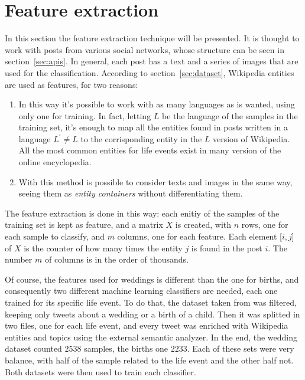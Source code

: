\section{Feature extraction}
\label{sec:featurextraction}
In this section the feature extraction technique will be presented. It is thought to work with posts from various social networks, whose structure can be seen in section~\ref{sec:apis}. In general, each post has a text and a series of images that are used for the classification. According to section~\ref{sec:dataset}, Wikipedia entities are used as features, for two reasons:
\begin{enumerate}
\item In this way it's possible to work with as many languages as is wanted, using only one for training. In fact, letting $ L $ be the language of the samples in the training set, it's enough to map all the entities found in posts written in a language $ L^{'} \ne L $ to the corrisponding entity in the $ L $ version of Wikipedia. All the most common entities for life events exist in many version of the online encyclopedia.
\item With this method is possible to consider texts and images in the same way, seeing them as \textit{entity containers} without differentiating them.
\end{enumerate}

The feature extraction is done in this way: each enitiy of the samples of the training set is kept as feature, and a matrix $X$ is created, with $n$ rows, one for each sample to classify, and $m$ columns, one for each feature. Each element [$i,j$] of $X$ is the counter of how many times the entity $j$ is found in the post $i$. The number $m$ of columns is in the order of thousands.

Of course, the features used for weddings is different than the one for births, and consequently two different machine learning classifiers are needed, each one trained for its specific life event. To do that, the dataset taken from \cite{dickinson2015identifying} was filtered, keeping only tweets about a wedding or a birth of a child. Then it was splitted in two files, one for each life event, and every tweet was enriched with Wikipedia entities and topics using the external semantic analyzer. In the end, the wedding dataset counted $2538$ samples, the births one $2233$. Each of these sets were very balance, with half of the sample related to the life event and the other half not. Both datasets were then used to train each classifier.

